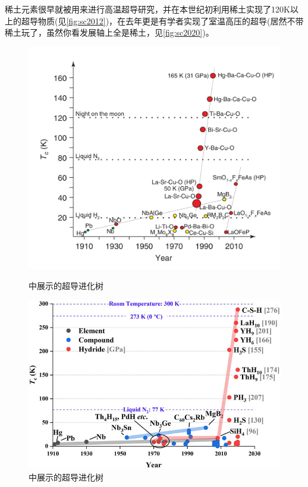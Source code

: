 稀土元素很早就被用来进行高温超导研究，并在本世纪初利用稀土实现了120K以上的超导物质(见\autoref{fig:sc2012})，在去年更是有学者实现了室温高压的超导(居然不带稀土玩了，虽然你看发展轴上全是稀土，见\autoref{fig:sc2020})。

\begin{figure}[H]
	\begin{minipage}{0.45\textwidth}
		\centering
		\includegraphics[width=1.05\columnwidth]{../images/superconduct1.png}
		\caption{中展示的超导进化树}
		\label{fig:sc2012}
	\end{minipage}\hfill
	\begin{minipage}{0.45\textwidth}
		\centering
		\includegraphics[width=1.05\columnwidth]{../images/superconduct2.jpg}
		\caption{中展示的超导进化树}
		\label{fig:sc2020}
	\end{minipage}
\end{figure}

